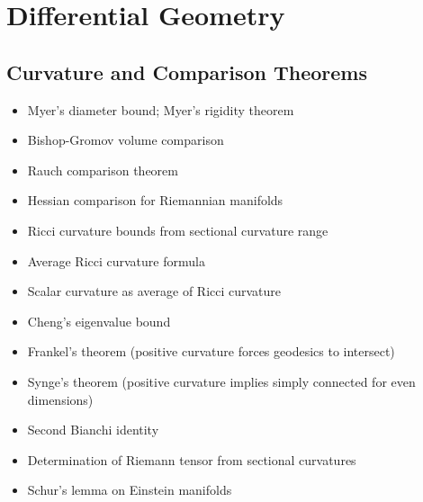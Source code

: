 \documentclass{amsart}
\begin{document}
\section{Differential Geometry}

\subsection{Curvature and Comparison Theorems}
\begin{itemize}
    \item Myer's diameter bound; Myer's rigidity theorem
    \item Bishop-Gromov volume comparison
    \item Rauch comparison theorem
    \item Hessian comparison for Riemannian manifolds
    \item Ricci curvature bounds from sectional curvature range
    \item Average Ricci curvature formula
    \item Scalar curvature as average of Ricci curvature
    \item Cheng's eigenvalue bound
    \item Frankel's theorem (positive curvature forces geodesics to intersect)
    \item Synge's theorem (positive curvature implies simply connected for even dimensions)
    \item Second Bianchi identity
    \item Determination of Riemann tensor from sectional curvatures
    \item Schur's lemma on Einstein manifolds
    \end{itemize}
\end{document}
